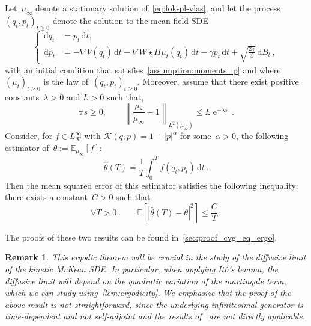\documentclass[onefignum,onetabnum]{siamart251216} %
\DeclareMathOperator{\e}{e}
\renewcommand{\d}{\mathrm{d}}
\newcommand{\expect}{\mathbb E}
\renewcommand{\leq}{\leqslant}
\renewcommand{\geq}{\geqslant}
\newcommand{\mescin}{\mu}
\theoremstyle{plain}
\newtheorem{remark}[theorem]{Remark}
\numberwithin{equation}{section}
\numberwithin{theorem}{section}
\begin{document}
\begin{corollary}
    \label{lem:ergodicity}
    Let~$\mescin_\infty$ denote a stationary solution of~\eqref{eq:fok-pl-vlas}, and let the process~$(q_t, p_t)_{t \geq 0}$ denote the solution to the mean field SDE
    \[
        \left\{
            \begin{aligned}
                \d q_t &= \displaystyle p_t \,\d t, \\
                \d p_t &= \displaystyle -\nabla V(q_t) \,\d t - \nabla W \star \Pi \mu_t (q_t)\,\d t -\gamma p_t \,\d t + \sqrt{\frac{2\gamma}{\beta}}\,\d B_t \, ,
            \end{aligned}
        \right.
    \]
    with an initial condition that satisfies~\cref{assumption:moments_p} and where $(\mu_t)_{t \geq 0}$ is the law of~$(q_t, p_t)_{t \geq 0}$.
    Moreover, assume that there exist positive constants~$\lambda > 0$ and $L > 0$ such that,
    \[
        \forall s \geq 0, \qquad
        \left\|\frac{\mu_s}{\mu_{\infty}} - 1\right\|_{L^2(\mu_{\infty})}
        \leq L \e^{-\lambda s} \, .
    \]
    Consider, for $f \in L^{\infty}_{\mathcal K }$ with $\mathcal K (q, p) = 1 + |p|^{\alpha}$ for some~$\alpha > 0$,
    the following estimator of~$\theta:= \expect_{\mescin_\infty}[f]$:
    \[
        \widehat \theta(T) = \frac{1}{T} \int_{0}^{T} f(q_t, p_t) \, \d t \, .
    \]
    Then the mean squared error of this estimator satisfies the following inequality: there exists a constant~$C > 0$ such that
    \[
        \forall T > 0, \qquad
        \expect \left[ \left| \widehat \theta(T) - \theta \right|^2  \right] \leq\frac{C}{T} \, .
    \]
\end{corollary}
The proofs of these two results can be found in~\cref{sec:proof_cvg_eq_ergo}.

\begin{remark}
This ergodic theorem will be crucial in the study of the diffusive limit of the kinetic McKean SDE. In particular, when applying It\^o's lemma, the diffusive limit will depend on the quadratic variation of the martingale term, which we can study using~\cref{lem:ergodicity}. We emphasize that the proof of the above result is not straightforward, since the underlying infinitesimal generator is time-dependent and not self-adjoint and the results of~\cite{bhattacharya1982functional} are not directly applicable.
\end{remark}
%
%
\end{document}
